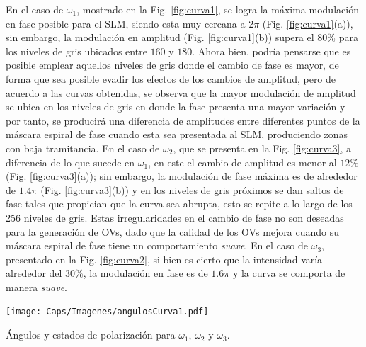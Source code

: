 En el caso de $\omega_1$, mostrado en la Fig. \ref{fig:curva1}, se logra la máxima modulación en fase posible para el SLM, siendo esta muy cercana a $2\pi$ (Fig. \ref{fig:curva1}(a)), sin embargo, la modulación en amplitud (Fig. \ref{fig:curva1}(b)) supera el $80\%$ para los niveles de gris ubicados entre $160$ y $180$. Ahora bien, podría pensarse que es posible emplear aquellos niveles de gris donde el cambio de fase es mayor, de forma que sea posible evadir los efectos de los cambios de amplitud, pero de acuerdo a las curvas obtenidas, se observa que la mayor modulación de amplitud se ubica en los niveles de gris en donde la fase presenta una mayor variación y por tanto, se producirá una diferencia de amplitudes entre diferentes puntos de la máscara espiral de fase cuando esta sea presentada al SLM, produciendo zonas con  baja tramitancia. En el caso de $\omega_2$, que se presenta en la Fig. \ref{fig:curva3}, a diferencia de lo que sucede en $\omega_1$, en este el cambio de amplitud es menor al $12 \%$ (Fig. \ref{fig:curva3}(a)); sin embargo, la modulación de fase máxima es de alrededor de $1.4\pi$ (Fig. \ref{fig:curva3}(b)) y en los niveles de gris próximos se dan saltos de fase tales que propician que la curva sea abrupta, esto se repite a lo largo de los 256 niveles de gris. Estas irregularidades en el cambio de fase no son deseadas para la generación de OVs, dado que la calidad de los OVs mejora cuando su máscara espiral de fase tiene un comportamiento \textit{suave}. En el caso de $\omega_3$, presentado en la Fig. \ref{fig:curva2}, si bien es cierto que la intensidad varía alrededor del $30\%$, la modulación en fase es de $1.6\pi$ y la curva se comporta de manera \textit{suave}.\\


\begin{table}[!ht]
 \centering
    \texttt{[image: Caps/Imagenes/angulosCurva1.pdf]}
  \caption{Ángulos y estados de polarización para $\omega_1$, $\omega_2$ y $\omega_3$.}
  \label{tab:angulos1}
\end{table}





